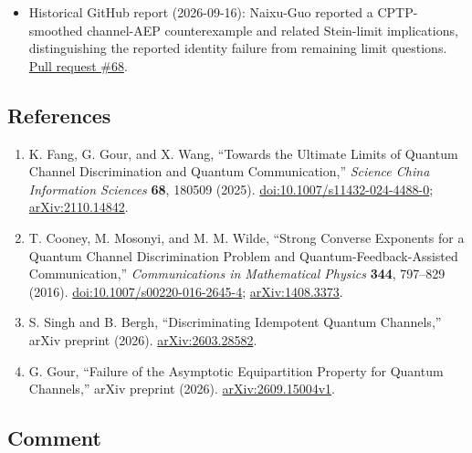 \begin{itemize}
  \item Historical GitHub report (2026-09-16): Naixu-Guo reported a CPTP-smoothed channel-AEP counterexample and related Stein-limit implications, distinguishing the reported identity failure from remaining limit questions. \href{https://github.com/Naixu-Guo/quantum-open-problems/pull/68}{Pull request \#68}.
\end{itemize}

\subsection*{References}

\begin{enumerate}[label={},leftmargin=4.8em,labelsep=0.5em]
  \footnotesize
  \item[\textup{[FGW25]}]\label{ref:p46-fang-gour-wang}
  K. Fang, G. Gour, and X. Wang,
  ``Towards the Ultimate Limits of Quantum Channel Discrimination and
  Quantum Communication,'' \emph{Science China Information Sciences}
  \textbf{68}, 180509 (2025).
  \href{https://doi.org/10.1007/s11432-024-4488-0}{doi:10.1007/s11432-024-4488-0};
  \href{https://arxiv.org/abs/2110.14842}{arXiv:2110.14842}.

  \item[\textup{[CMW16]}]\label{ref:p46-cooney-mosonyi-wilde}
  T. Cooney, M. Mosonyi, and M. M. Wilde,
  ``Strong Converse Exponents for a Quantum Channel Discrimination Problem
  and Quantum-Feedback-Assisted Communication,''
  \emph{Communications in Mathematical Physics} \textbf{344}, 797--829
  (2016).
  \href{https://doi.org/10.1007/s00220-016-2645-4}{doi:10.1007/s00220-016-2645-4};
  \href{https://arxiv.org/abs/1408.3373}{arXiv:1408.3373}.

  \item[\textup{[SB26]}]\label{ref:p46-singh-bergh}
  S. Singh and B. Bergh, ``Discriminating Idempotent Quantum Channels,''
  arXiv preprint (2026).
  \href{https://arxiv.org/abs/2603.28582}{arXiv:2603.28582}.

  \item[\textup{[Gou26]}]\label{ref:p46-gour-aep}
  G. Gour, ``Failure of the Asymptotic Equipartition Property for Quantum
  Channels,'' arXiv preprint (2026).
  \href{https://arxiv.org/abs/2609.15004v1}{arXiv:2609.15004v1}.
\end{enumerate}

\subsection*{Comment}

